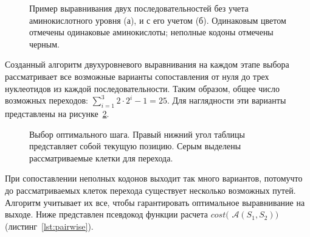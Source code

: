 \begin{figure}[h]
	\begin{minipage}[h]{0.49\linewidth}
	\end{minipage}
	\hfill
	\begin{minipage}[h]{0.49\linewidth}
	\end{minipage}
	\caption{Пример выравнивания двух последовательностей без учета аминокислотного уровня (а), и с его учетом (б). Одинаковым цветом отмечены одинаковые аминокислоты; неполные кодоны отмечены черным.}
	\label{ris:NWvsMULTY}
\end{figure}

\indent Созданный алгоритм двухуровневого выравнивания на каждом этапе выбора рассматривает все возможные варианты сопоставления от нуля до трех нуклеотидов из каждой последовательности. Таким образом, общее число возможных переходов: $\sum_{i=1}^3 2\cdot 2^i-1=25$. Для наглядности эти варианты представлены на рисунке~\ref{ris:25variants}. 

\begin{figure}[H]
	\begin{minipage}[h]{0.31\linewidth}
	\end{minipage}
	\hfill
	\begin{minipage}[h]{0.31\linewidth}
	\end{minipage}
	\hfill
	\begin{minipage}[h]{0.31\linewidth}
	\end{minipage}
	\caption{Выбор оптимального шага. Правый нижний угол таблицы представляет собой текущую позицию. Серым выделены рассматриваемые клетки для перехода.}
	\label{ris:25variants}
\end{figure}

\indent При сопоставлении неполных кодонов выходит так много вариантов, потомучто до рассматриваемых клеток перехода существует несколько возможных путей. Алгоритм учитывает их все, чтобы гарантировать оптимальное выравнивание на выходе. Ниже представлен псевдокод функции расчета $cost($ $\mathcal{A}(S_1, S_2))$ (листинг~\ref{lst:pairwise}).

